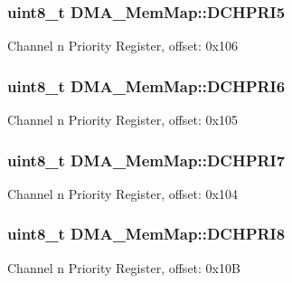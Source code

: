 \subsubsection[{D\+C\+H\+P\+R\+I5}]{\setlength{\rightskip}{0pt plus 5cm}uint8\+\_\+t D\+M\+A\+\_\+\+Mem\+Map\+::\+D\+C\+H\+P\+R\+I5}\label{struct_d_m_a___mem_map_a4bfc2aa5a849643e32da3612393f5b2b}
Channel n Priority Register, offset\+: 0x106 \hypertarget{struct_d_m_a___mem_map_afae44bbca4dbe8fa13517fbc57aaf8c1}{}
\subsubsection[{D\+C\+H\+P\+R\+I6}]{\setlength{\rightskip}{0pt plus 5cm}uint8\+\_\+t D\+M\+A\+\_\+\+Mem\+Map\+::\+D\+C\+H\+P\+R\+I6}\label{struct_d_m_a___mem_map_afae44bbca4dbe8fa13517fbc57aaf8c1}
Channel n Priority Register, offset\+: 0x105 \hypertarget{struct_d_m_a___mem_map_a8d4c0aeaadfcd877cbaf9ad7adc7828e}{}
\subsubsection[{D\+C\+H\+P\+R\+I7}]{\setlength{\rightskip}{0pt plus 5cm}uint8\+\_\+t D\+M\+A\+\_\+\+Mem\+Map\+::\+D\+C\+H\+P\+R\+I7}\label{struct_d_m_a___mem_map_a8d4c0aeaadfcd877cbaf9ad7adc7828e}
Channel n Priority Register, offset\+: 0x104 \hypertarget{struct_d_m_a___mem_map_aaf35a15b1aeb54e1a1f6806283eef6c2}{}
\subsubsection[{D\+C\+H\+P\+R\+I8}]{\setlength{\rightskip}{0pt plus 5cm}uint8\+\_\+t D\+M\+A\+\_\+\+Mem\+Map\+::\+D\+C\+H\+P\+R\+I8}\label{struct_d_m_a___mem_map_aaf35a15b1aeb54e1a1f6806283eef6c2}
Channel n Priority Register, offset\+: 0x10\+B \hypertarget{struct_d_m_a___mem_map_a364959f468d1568b369d5a398ad30551}{}
